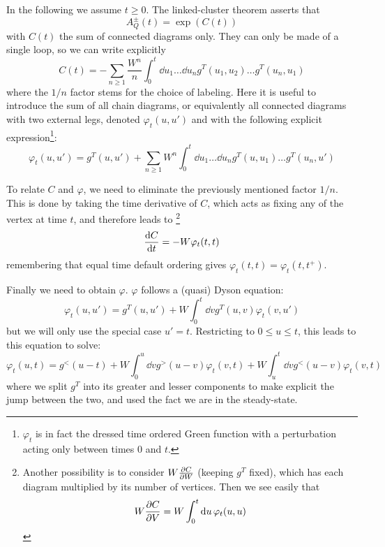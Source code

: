 \documentclass[12pt]{article}
\begin{document}
In the following we assume $t \ge 0$.
The linked-cluster theorem asserts that
\begin{equation}
	A^{\pm}_Q(t) = \exp(C(t))
\end{equation}
with $C(t)$ the sum of connected diagrams only. They can only be made of a single loop, so we can write explicitly
\begin{equation}
	C(t) = - \sum_{n \ge 1} \frac{W^n}{n} \int_0^t \dd{u_1} \ldots \dd{u_n} g^T(u_1, u_2) \ldots g^T(u_n, u_1)
\end{equation}
where the $1/n$ factor stems for the choice of labeling.
Here it is useful to introduce the sum of all chain diagrams, or equivalently all connected diagrams with two external legs, denoted $\varphi_t(u, u')$ and with the following explicit expression\footnote{$\varphi_t$ is in fact the dressed time ordered Green function with a perturbation acting only between times $0$ and $t$.}:
\begin{equation}
	\varphi_t(u, u') = g^T(u, u') + \sum_{n \ge 1} W^n \int_0^t \dd{u_1} \ldots \dd{u_n} g^T(u, u_1) \ldots g^T(u_n, u')
\end{equation}

To relate $C$ and $\varphi$, we need to eliminate the previously mentioned factor $1/n$. 
This is done by taking the time derivative of $C$, which acts as fixing any of the vertex at time $t$, and therefore leads to%
\footnote{
Another possibility is to consider $W \pdv{C}{W}$ (keeping $g^T$ fixed), which has each diagram multiplied by its number of vertices. Then we see easily that
\begin{equation}
	W \pdv{C}{V} = W \int_0^t \dd{u} \varphi_t(u, u)
\end{equation}
}
\begin{equation}
	\dv{C}{t} = -W \varphi_t(t, t)
\end{equation}
remembering that equal time default ordering gives $\varphi_t(t, t) = \varphi_t(t, t^+)$.

Finally we need to obtain $\varphi$. 
$\varphi$ follows a (quasi) Dyson equation:
\begin{equation}
	\varphi_t(u, u') = g^T(u, u') + W \int_0^t \dd{v} g^T(u, v) \varphi_t(v, u')
\end{equation}
but we will only use the special case $u' = t$. Restricting to $0 \le u \le t$, this leads to this equation to solve:
\begin{equation}
	\label{eq:quasi_Dyson}
	\varphi_t(u, t) = g^<(u - t) + W \int_0^u \dd{v} g^>(u - v) \varphi_t(v, t) + W \int_u^t \dd{v} g^<(u - v) \varphi_t(v, t)
\end{equation}
where we split $g^T$ into its greater and lesser components to make explicit the jump between the two, and used the fact we are in the steady-state.
\end{document}
